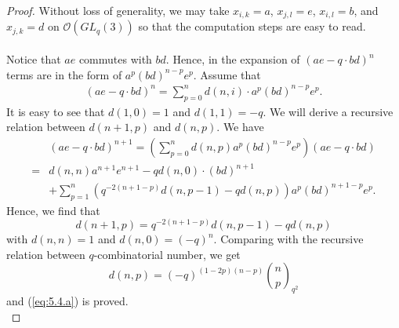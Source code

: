 \documentclass[table,a4paper,reqno]{amsart}
\numberwithin{equation}{section}
\theoremstyle{definition}
\begin{document}
\begin{proof}
    Without loss of generality, we may take $x_{i,k}=a$, $x_{j,l}=e$, $x_{i,l}=b$, and $x_{j,k}=d$ on $\mathcal{O}(GL_q(3))$ so that the computation steps are easy to read.\\
    \\
    Notice that $ae$ commutes with $bd$. Hence, in the expansion of $(ae-q\cdot bd)^n$ terms are in the form of $a^p(bd)^{n-p}e^p$. Assume that 
    \begin{equation}
        \begin{split}
            (ae-q\cdot bd)^n=\sum_{p=0}^nd(n,i)\cdot a^p(bd)^{n-p}e^p.
        \end{split}
    \end{equation}
    It is easy to see that $d(1,0)=1$ and $d(1,1)=-q$. We will derive a recursive relation between $d(n+1,p)$ and $d(n,p)$. We have
    \begin{equation}
    \begin{split}
        &(ae-q\cdot bd)^{n+1}=\left(\sum_{p=0}^{n}d(n,p)a^p(bd)^{n-p}e^p\right)(ae-q\cdot bd)\\
        =&d(n,n)a^{n+1}e^{n+1}-qd(n,0)\cdot (bd)^{n+1}\\
        &+\sum_{p=1}^{n}(q^{-2(n+1-p)}d(n,p-1)-qd(n,p))a^{p}(bd)^{n+1-p}e^p.
    \end{split}
    \end{equation}
    Hence, we find that
    \begin{equation}
    d(n+1,p)=q^{-2(n+1-p)}d(n,p-1)-qd(n,p)
    \end{equation}
    with $d(n,n)=1$ and $d(n,0)=(-q)^n$. Comparing with the recursive relation between $q$-combinatorial number, we get
    \begin{equation}
        d(n,p)=(-q)^{(1-2p)(n-p)}{n\choose p}_{q^2}
    \end{equation}
    and (\ref{eq:5.4.a}) is proved.\\

\end{proof}
\end{document}
